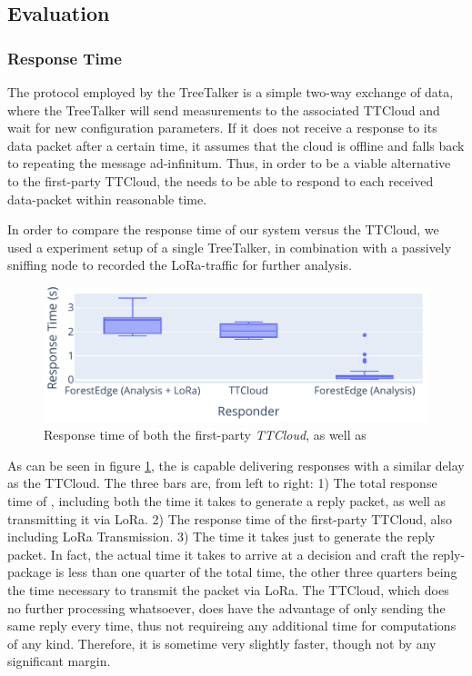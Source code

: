 \subsection{Evaluation}
\label{sec:TreeTalker:evaluation}

\subsubsection{Response Time}
\label{sec:evaluation:response-time}

The protocol employed by the TreeTalker is a simple two-way exchange of data, where the TreeTalker will send measurements to the associated TTCloud and wait for new configuration parameters.
If it does not receive a response to its data packet after a certain time, it assumes that the cloud is offline and falls back to repeating the message ad-infinitum.
Thus, in order to be a viable alternative to the first-party TTCloud, the \ttt needs to be able to respond to each received data-packet within reasonable time.

In order to compare the response time of our system versus the TTCloud, we used a experiment setup of a single TreeTalker, in combination with a passively sniffing node to recorded the LoRa-traffic for further analysis.

\begin{figure}
    \centering
    \includegraphics[width=\linewidth]{figures/response_times.pdf}
    \caption{Response time of both the first-party \textit{TTCloud}, as well as \textit{\ttt}}
    \label{fig:response_times}
\end{figure}

As can be seen in figure \ref{fig:response_times}, the \ttt is capable delivering responses with a similar delay as the TTCloud.
The three bars are, from left to right: 1) The total response time of \ttt, including both the time it takes to generate a reply packet, as well as transmitting it via LoRa. 2) The response time of the first-party TTCloud, also including LoRa Transmission. 3) The time it takes \ttt just to generate the reply packet.
In fact, the actual time it takes to arrive at a decision and craft the reply-package is less than one quarter of the total time, the other three quarters being the time necessary to transmit the packet via LoRa.
The TTCloud, which does no further processing whatsoever, does have the advantage of only sending the same reply every time, thus not requireing any additional time for computations of any kind.
Therefore, it is sometime very slightly faster, though not by any significant margin.

